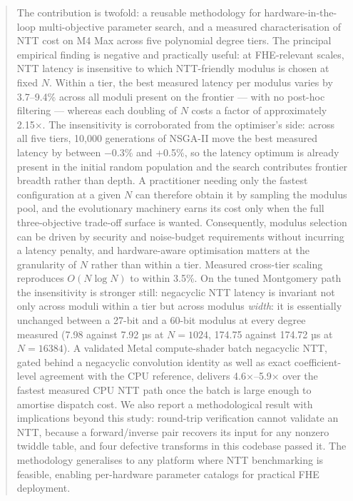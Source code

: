 \begin{abstract}
The contribution is twofold: a reusable methodology for hardware-in-the-loop multi-objective parameter search, and a measured characterisation of NTT cost on M4 Max across five polynomial degree tiers. The principal empirical finding is negative and practically useful: at FHE-relevant scales, NTT latency is insensitive to which NTT-friendly modulus is chosen at fixed \(N\). Within a tier, the best measured latency per modulus varies by 3.7--9.4\% across all moduli present on the frontier --- with no post-hoc filtering --- whereas each doubling of \(N\) costs a factor of approximately 2.15×. The insensitivity is corroborated from the optimiser's side: across all five tiers, 10,000 generations of NSGA-II move the best measured latency by between −0.3\% and +0.5\%, so the latency optimum is already present in the initial random population and the search contributes frontier breadth rather than depth. A practitioner needing only the fastest configuration at a given \(N\) can therefore obtain it by sampling the modulus pool, and the evolutionary machinery earns its cost only when the full three-objective trade-off surface is wanted. Consequently, modulus selection can be driven by security and noise-budget requirements without incurring a latency penalty, and hardware-aware optimisation matters at the granularity of \(N\) rather than within a tier. Measured cross-tier scaling reproduces \(O(N \log N)\) to within 3.5\%. On the tuned Montgomery path the insensitivity is stronger still: negacyclic NTT latency is invariant not only across moduli within a tier but across modulus \emph{width}: it is essentially unchanged between a 27-bit and a 60-bit modulus at every degree measured (7.98 against 7.92 µs at \(N = 1024\), 174.75 against 174.72 µs at \(N = 16384\)). A validated Metal compute-shader batch negacyclic NTT, gated behind a negacyclic convolution identity as well as exact coefficient-level agreement with the CPU reference, delivers 4.6×--5.9× over the fastest measured CPU NTT path once the batch is large enough to amortise dispatch cost. We also report a methodological result with implications beyond this study: round-trip verification cannot validate an NTT, because a forward/inverse pair recovers its input for any nonzero twiddle table, and four defective transforms in this codebase passed it. The methodology generalises to any platform where NTT benchmarking is feasible, enabling per-hardware parameter catalogs for practical FHE deployment.

\end{abstract}

